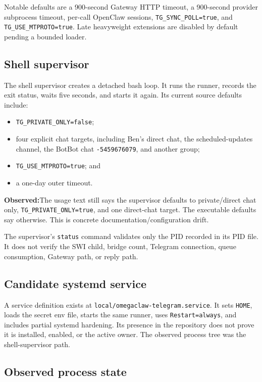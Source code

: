 \documentclass[10pt]{article}
\newcommand{\code}[1]{\texttt{#1}}
\newcommand{\observed}{\textbf{Observed:}}
\begin{document}
Notable defaults are a 900-second Gateway HTTP timeout, a 900-second provider subprocess timeout, per-call OpenClaw sessions, \code{TG\_SYNC\_POLL=true}, and \code{TG\_USE\_MTPROTO=true}. Late heavyweight extensions are disabled by default pending a bounded loader.

\subsection{Shell supervisor}

The shell supervisor creates a detached bash loop. It runs the runner, records the exit status, waits five seconds, and starts it again. Its current source defaults include:
\begin{itemize}
  \item \code{TG\_PRIVATE\_ONLY=false};
  \item four explicit chat targets, including Ben's direct chat, the scheduled-updates channel, the BotBot chat \code{-5459676079}, and another group;
  \item \code{TG\_USE\_MTPROTO=true}; and
  \item a one-day outer timeout.
\end{itemize}

\observed The usage text still says the supervisor defaults to private/direct chat only, \code{TG\_PRIVATE\_ONLY=true}, and one direct-chat target. The executable defaults say otherwise. This is concrete documentation/configuration drift.

The supervisor's \code{status} command validates only the PID recorded in its PID file. It does not verify the SWI child, bridge count, Telegram connection, queue consumption, Gateway path, or reply path.

\subsection{Candidate systemd service}

A service definition exists at \code{local/omegaclaw-telegram.service}. It sets \code{HOME}, loads the secret env file, starts the same runner, uses \code{Restart=always}, and includes partial systemd hardening. Its presence in the repository does not prove it is installed, enabled, or the active owner. The observed process tree was the shell-supervisor path.

\subsection{Observed process state}
\end{document}
